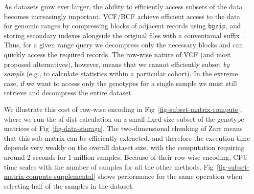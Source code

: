 \documentclass[a4paper,num-refs]{oup-contemporary}
\begin{document}
As datasets grow ever larger, the ability to efficiently access subsets
of the data becomes increasingly important. VCF/BCF achieve efficient
access to the data for genomic ranges
by compressing blocks of adjacent records using \texttt{bgzip},
and storing secondary indexes alongside the original
files with a conventional suffix~\citep{li2011tabix}.
Thus, for a given range query we
decompress only the necessary blocks and can quickly access
the required records.
The row-wise nature of VCF (and most proposed alternatives), however, means
that we cannot efficiently subset \emph{by sample}
(e.g., to calculate statistics within a particular cohort). In the extreme
case, if we want to access only the genotypes for a single sample
we must still retrieve and decompress the entire dataset.

We illustrate this cost of row-wise encoding in
Fig~\ref{fig-subset-matrix-compute}, where we run the af-dist calculation
on a small fixed-size subset of the genotype matrices of
Fig~\ref{fig-data-storage}. The two-dimensional chunking of Zarr
means that this sub-matrix can be efficiently
extracted, and therefore the execution time depends very weakly on
the overall dataset size, with the computation requiring around
2 seconds for 1 million samples. Because of their
row-wise encoding, CPU time scales with the number of samples
for all the other methods.
Fig~\ref{fig-subset-matrix-compute-supplemental} shows performance
for the same operation when selecting half of the samples in the
dataset.
\end{document}
